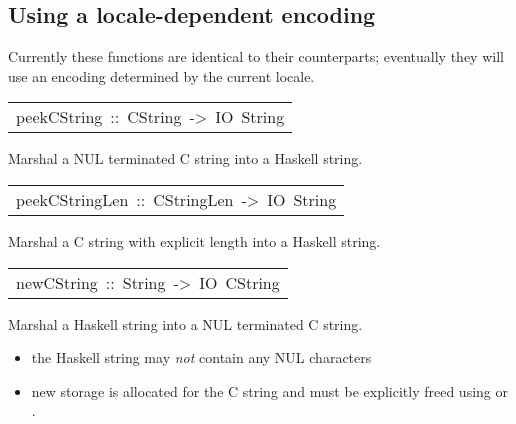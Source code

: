 \subsection{Using a locale-dependent encoding
}
Currently these functions are identical to their  counterparts;
 eventually they will use an encoding determined by the current locale.
\par

\begin{haddockdesc}
\item[\begin{tabular}{@{}l}
peekCString\ ::\ CString\ ->\ IO\ String
\end{tabular}]\haddockbegindoc
Marshal a NUL terminated C string into a Haskell string.
\par

\end{haddockdesc}
\begin{haddockdesc}
\item[\begin{tabular}{@{}l}
peekCStringLen\ ::\ CStringLen\ ->\ IO\ String
\end{tabular}]\haddockbegindoc
Marshal a C string with explicit length into a Haskell string.
\par

\end{haddockdesc}
\begin{haddockdesc}
\item[\begin{tabular}{@{}l}
newCString\ ::\ String\ ->\ IO\ CString
\end{tabular}]\haddockbegindoc
Marshal a Haskell string into a NUL terminated C string.
\par
\begin{itemize}
\item
 the Haskell string may \emph{not} contain any NUL characters
\par

\item
 new storage is allocated for the C string and must be
   explicitly freed using  or
   .
\par

\end{itemize}

\end{haddockdesc}
